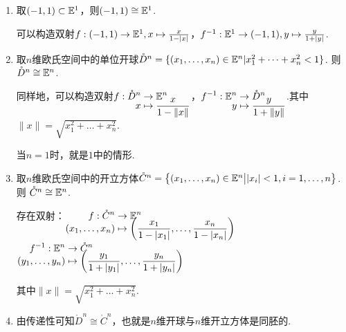 \begin{instance}
    \begin{enumerate}
        \item 取$(-1,1)\subset \mathbb{E}^1$，则$(-1,1)\cong \mathbb{E}^1$.\par
        可以构造双射$f:(-1,1)\to\mathbb{E}^1, x\mapsto \frac{x}{1-|x|}$，$f^{-1}:\mathbb{E}^1\to(-1,1), y\mapsto \frac{y}{1+|y|}$.

        \item 取$n$维欧氏空间中的单位开球$\mathring{D}^n = \{(x_1,\dots,x_n)\in\mathbb{E}^n | x_1^2+\dots+x_n^2 < 1\}$. 则$\mathring{D}^n \cong \mathbb{E}^n$.\par
        同样地，可以构造双射$\setjot[-6]\begin{aligned}[t]
            f:\mathring{D}^n&\to\mb{E}^n \\
            x&\mapsto \frac{x}{1-\|x\|}
        \end{aligned}$，$\setjot[-6]\begin{aligned}[t]
            f^{-1}:\mb{E}^n&\to\mathring{D}^n \\ 
            y&\mapsto \frac{y}{1+\|y\|}
        \end{aligned}$.其中$\|x\|=\sqrt{x_1^2+\dots+x_n^2}$.\par
        当$n=1$时，就是$1$中的情形.
        \item 取$n$维欧氏空间中的开立方体$\mathring{C}^n = \big\{(x_1,\dots,x_n)\in\mathbb{E}^n \big| |x_i|<1, i=1,\dots,n\big\}$. 则 $\mathring{C}^n \cong \mathbb{E}^n$.\par
        存在双射：$\setjot[-6]\begin{aligned}[t]
            f:\mathring{C}^n&\to\mb{E}^n \\
            (x_1,\dots,x_n)&\mapsto \left(\frac{x_1}{1-|x_1|},\dots,\frac{x_n}{1-|x_n|}\right)
        \end{aligned}$\quad$\setjot[-6]\begin{aligned}[t]
            f^{-1}:\mb{E}^n&\to\mathring{C}^n \\
            (y_1,\dots,y_n)&\mapsto \left(\frac{y_1}{1+|y_1|},\dots,\frac{y_n}{1+|y_n|}\right)
        \end{aligned}$\par
        其中$\|x\|=\sqrt{x_1^2+\dots+x_n^2}$.\par
        \item 由传递性可知$\mathring{D}^n \cong \mathring{C}^n$，也就是$n$维开球与$n$维开立方体是同胚的.
    \end{enumerate}\par

\end{instance}
